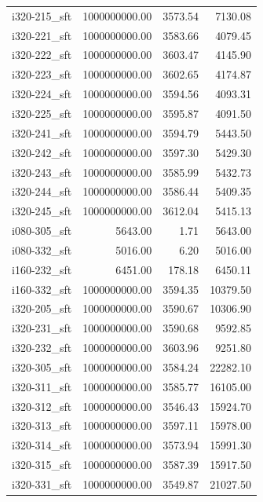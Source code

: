\begin{tabular}{lrrr}
i320-215\_sft & 1000000000.00 &           3573.54 &     7130.08 \\
i320-221\_sft & 1000000000.00 &           3583.66 &     4079.45 \\
i320-222\_sft & 1000000000.00 &           3603.47 &     4145.90 \\
i320-223\_sft & 1000000000.00 &           3602.65 &     4174.87 \\
i320-224\_sft & 1000000000.00 &           3594.56 &     4093.31 \\
i320-225\_sft & 1000000000.00 &           3595.87 &     4091.50 \\
i320-241\_sft & 1000000000.00 &           3594.79 &     5443.50 \\
i320-242\_sft & 1000000000.00 &           3597.30 &     5429.30 \\
i320-243\_sft & 1000000000.00 &           3585.99 &     5432.73 \\
i320-244\_sft & 1000000000.00 &           3586.44 &     5409.35 \\
i320-245\_sft & 1000000000.00 &           3612.04 &     5415.13 \\
i080-305\_sft &       5643.00 &              1.71 &     5643.00 \\
i080-332\_sft &       5016.00 &              6.20 &     5016.00 \\
i160-232\_sft &       6451.00 &            178.18 &     6450.11 \\
i160-332\_sft & 1000000000.00 &           3594.35 &    10379.50 \\
i320-205\_sft & 1000000000.00 &           3590.67 &    10306.90 \\
i320-231\_sft & 1000000000.00 &           3590.68 &     9592.85 \\
i320-232\_sft & 1000000000.00 &           3603.96 &     9251.80 \\
i320-305\_sft & 1000000000.00 &           3584.24 &    22282.10 \\
i320-311\_sft & 1000000000.00 &           3585.77 &    16105.00 \\
i320-312\_sft & 1000000000.00 &           3546.43 &    15924.70 \\
i320-313\_sft & 1000000000.00 &           3597.11 &    15978.00 \\
i320-314\_sft & 1000000000.00 &           3573.94 &    15991.30 \\
i320-315\_sft & 1000000000.00 &           3587.39 &    15917.50 \\
i320-331\_sft & 1000000000.00 &           3549.87 &    21027.50 \\

\end{tabular}
